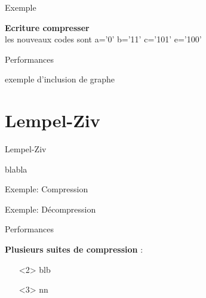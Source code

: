\documentclass[french]{beamer}
\begin{document}
\begin{frame}{Exemple}
\begin{center}

\textbf{Ecriture compresser}\\
les nouveaux codes sont a='0' b='11' c='101' e='100'
\end{center}
\end{frame}
\begin{frame}{Performances}
	\begin{center}
	exemple d'inclusion de graphe 
	\end{center}
\end{frame}

\section{Lempel-Ziv}
\begin{frame}{Lempel-Ziv}
	\begin{center}
	blabla
	\end{center}
\end{frame}


\begin{frame}{Exemple: Compression}
	\begin{center}
	\end{center}
\end{frame}
\begin{frame}{Exemple: Décompression}
	\begin{center}
	\end{center}
\end{frame}

\begin{frame}{Performances}
	\begin{center}
	\textbf{Plusieurs suites de compression} :
	\begin{itemize}
	\item[]<2>  	blb%
	\item[]<3>  	nn%
	\end{itemize}
	\end{center}
\end{frame}
\end{document}
